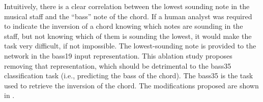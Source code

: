 
Intuitively, there is a clear correlation between the lowest
sounding note in the musical staff and the ``bass'' note of
the chord. If a human analyst was required to indicate the
inversion of a chord knowing which notes are sounding in the
staff, but not knowing which of them is sounding the lowest,
it would make the task very difficult, if not impossible.
The lowest-sounding note is provided to the network in the
\gls{bass19} input representation. This ablation study
proposes removing that representation, which should be
detrimental to the \gls{bass35} classification task (i.e.,
predicting the bass of the chord). The \gls{bass35} is the
task used to retrieve the inversion of the chord. The
modifications proposed are shown in .

